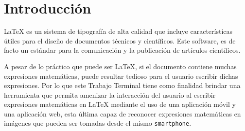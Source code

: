 \chapter{Introducción}




LaTeX es un sistema de tipografía de alta calidad que incluye características útiles para el diseño de documentos técnicos y científicos. Este software, es de facto un estándar para la comunicación y la publicación de artículos científicos. %
\bigskip

A pesar de lo práctico que puede ser LaTeX, si el documento contiene muchas expresiones matemáticas, puede resultar tedioso para el usuario escribir dichas expresiones. Por lo que este Trabajo Terminal tiene como finalidad brindar una herramienta que permita amenizar la interacción del usuario al escribir expresiones matemáticas en LaTeX mediante el uso de una aplicación móvil y una aplicación web, esta última capaz de reconocer expresiones matemáticas en imágenes que pueden ser tomadas desde el mismo \texttt{smartphone}.
\bigskip


